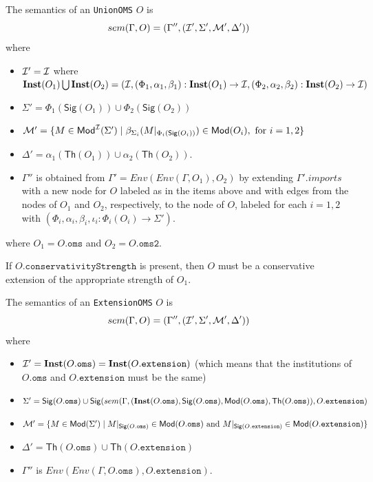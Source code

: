 \documentclass[10pt, a4paper]{isov2}
\newcommand*{\syntax}[1]{\texttt{#1}}
\newcommand{\Sig}{\mathsf{Sig}}
\renewcommand{\Th}{\mathsf{Th}}
\newcommand{\Inst}{\ensuremath{\mathbf{Inst}}}
\begin{document}
The semantics of an \syntax{UnionOMS} $O$ is
$$sem(\Gamma, O) = (\Gamma'',({\cal I}',\Sigma',{\cal M}',\Delta'))$$
\noindent where
\begin{itemize}
  \item ${\cal I}' = {\cal I}$ where
    $\Inst(O_1) \bigcup \Inst(O_2) =(\cI, (\Phi_1, \alpha_1,\beta_1) : \Inst(O_1) \rightarrow \cI, 
                    (\Phi_2, \alpha_2,\beta_2) : \Inst(O_2) \rightarrow \cI)$
  \item $\Sigma' = \Phi_1(\Sig(O_1)) \cup \Phi_2(\Sig(O_2))$
  \item $\cM' = \{ M\in \Mod^\cI(\Sigma') \mid \beta_{\Sigma_i}(M\forget{\Phi_i(\Sig(O_i))}) \in \Mod(O_i), \text{ for } i=1,2 \}$
  \item $\Delta' = \alpha_1(\Th(O_1)) \cup \alpha_2(\Th(O_2))$.
    \item 
        $\Gamma''$ is obtained from 
       $\Gamma' = Env(Env(\Gamma,O_1), O_2)$
       by extending $\Gamma'.imports$
       with a new node for $O$ labeled as in the items above and
       with edges from the nodes of $O_1$ and $O_2$,
       respectively, to the node of $O$,
        labeled for each $i=1,2$ with
        $(\Phi_i, \alpha_i,\beta_i, \iota_i: \Phi_i(O_i) \to \Sigma')$.
\end{itemize}
where $O_1 = O.\syntax{oms}$ and $O_2 = O.\syntax{oms2}$. 

If $O.\syntax{conservativityStrength}$ is present, then $O$ must be a conservative extension
of the appropriate strength of $O_1$.


The semantics of an \syntax{ExtensionOMS} $O$ is
$$sem(\Gamma, O) = (\Gamma'',({\cal I}',\Sigma',{\cal M}',\Delta'))$$
\noindent where
\begin{itemize}
  \item $\cI' = \Inst(O.\syntax{oms}) = \Inst(O.\syntax{extension})$ 
  (which means that
  the institutions of $O.\syntax{oms}$ and 
  $O.\syntax{extension}$ must be the same)
  \item $\Sigma' = \Sig(O.\syntax{oms}) \cup 
  \Sig(sem(\Gamma, 
       (\Inst(O.\syntax{oms}), \Sig(O.\syntax{oms}), \Mod(O.\syntax{oms}), \Th(O.\syntax{oms}) ),
  O.\syntax{extension})$
  \item $\cM' = \{ M\in \Mod(\Sigma') \mid M\forget{\Sig(O.\syntax{oms})} \in \Mod(O.\syntax{oms})
  \text{ and }
  M \forget{\Sig(O.\syntax{extension})} \in \Mod(O.\syntax{extension})\}$
  \item $\Delta' = \Th(O.\syntax{oms}) \cup \Th(O.\syntax{extension})$
  \item $\Gamma''$ is $Env(Env(\Gamma, O.\syntax{oms}), O.\syntax{extension})$.
\end{itemize}
\end{document}

